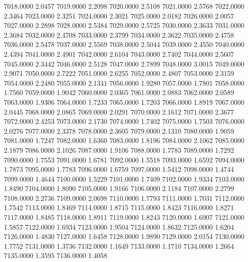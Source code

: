 7018.0000      2.0457
7019.0000      2.2098
7020.0000      2.5108
7021.0000      2.5768
7022.0000      2.3464
7023.0000      2.3251
7024.0000      2.3021
7025.0000      2.0182
7026.0000      2.0057
7027.0000      2.2898
7028.0000      2.5384
7029.0000      2.5725
7030.0000      2.3633
7031.0000      2.3684
7032.0000      2.4708
7033.0000      2.3799
7034.0000      2.3622
7035.0000      2.4758
7036.0000      2.5478
7037.0000      2.5569
7038.0000      2.5044
7039.0000      2.4550
7040.0000      2.4394
7041.0000      2.4901
7042.0000      2.6104
7043.0000      2.7402
7044.0000      2.5607
7045.0000      2.3442
7046.0000      2.5128
7047.0000      2.7899
7048.0000      3.0015
7049.0000      2.9071
7050.0000      2.7222
7051.0000      2.6255
7052.0000      2.4807
7053.0000      2.3159
7054.0000      2.2480
7055.0000      2.1341
7056.0000      1.9280
7057.0000      1.7801
7058.0000      1.7560
7059.0000      1.9042
7060.0000      2.0365
7061.0000      2.0883
7062.0000      2.0589
7063.0000      1.9306
7064.0000      1.7233
7065.0000      1.7203
7066.0000      1.8919
7067.0000      2.0445
7068.0000      2.0865
7069.0000      2.0291
7070.0000      2.1612
7071.0000      2.3677
7072.0000      2.4253
7073.0000      2.1730
7074.0000      1.7402
7075.0000      1.7503
7076.0000      2.0276
7077.0000      2.3378
7078.0000      2.3605
7079.0000      2.1310
7080.0000      1.9059
7081.0000      1.7247
7082.0000      1.6360
7083.0000      1.8196
7084.0000      2.1062
7085.0000      2.1879
7086.0000      2.1026
7087.0000      1.9106
7088.0000      1.7783
7089.0000      1.7292
7090.0000      1.7553
7091.0000      1.6781
7092.0000      1.5518
7093.0000      1.6592
7094.0000      1.7873
7095.0000      1.7783
7096.0000      1.6759
7097.0000      1.5412
7098.0000      1.4744
7099.0000      1.4644
7100.0000      1.5229
7101.0000      1.7409
7102.0000      1.9334
7103.0000      1.8490
7104.0000      1.8090
7105.0000      1.9166
7106.0000      2.1184
7107.0000      2.2799
7108.0000      2.2736
7109.0000      2.0698
7110.0000      1.7793
7111.0000      1.7031
7112.0000      1.7542
7113.0000      1.8469
7114.0000      1.8715
7115.0000      1.8423
7116.0000      1.8271
7117.0000      1.8485
7118.0000      1.8911
7119.0000      1.8243
7120.0000      1.6907
7121.0000      1.5857
7122.0000      1.6934
7123.0000      1.9504
7124.0000      1.8632
7125.0000      1.6204
7126.0000      1.4830
7127.0000      1.6458
7128.0000      1.9890
7129.0000      2.0154
7130.0000      1.7752
7131.0000      1.3736
7132.0000      1.1649
7133.0000      1.1710
7134.0000      1.2664
7135.0000      1.3595
7136.0000      1.4058
